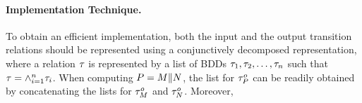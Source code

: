 \noindent
\paragraph{Implementation Technique.}
\begin{comment}
To obtain an efficient implementation, it is important to use a
conjunctively decomposed representation for the Binary Decision
Diagrams (BDDs) representing the transition relations, and to
derive the new input transition relation for a composed interface
again in conjunctively decomposed form. In fact, the (output)
transition relation $\otrans$ of a module is best represented not
as a single BDD (Binary Decision Diagram), but as a list of BDDs
$\otrans_1, \otrans_2, \ldots, \otrans_n$, such that $\otrans =
\bigwedge_{i=1}^n \otrans_i$: the BDDs $\otrans_1, \otrans_2,
\ldots, \otrans_n$ are often small, and can be constructed
efficiently while parsing the input. For example, in {\em reactive
modules\/} \cite{RM96journal} each $\otrans_i$, for $1 \leq i \leq
n$, can be obtained by parsing a single {\em atom,} which
describes the updates of only a handful of variables;
a similar consideration holds for the input language of e.g.\ SMV
\cite{SMV96}. Furthermore, highly efficient {\em image computation
techniques\/} have been implemented for computing formulas of the
form $\exists \vars . \bigwedge_{i=1}^n \otrans_i$; such
techniques are at the heart of symbolic reachability algorithms
\cite{ranjan97}. The input and output transition relations of
Synchronous interfaces in conjunctively decomposed form are
represented as lists of BDDs.
\end{comment}
%
To obtain an efficient implementation, both the input and the
output transition relations should be represented
using a conjunctively decomposed representation, where a relation
$\tau$ is represented by a list of BDDs $\tau_1, \tau_2,
\ldots, \tau_n$ such that $\tau = \wedge_{i=1}^n \tau_i$.
When computing $P = M \| N$, the list for $\tau^o_P$ can
be readily obtained by concatenating the lists for $\tau^o_M$
and $\tau^o_N$. Moreover,
